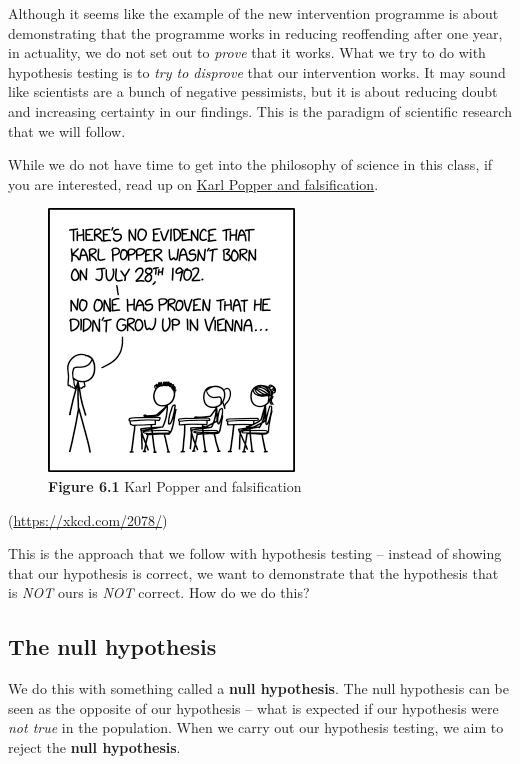 \documentclass[
]{book}
\begin{document}
Although it seems like the example of the new intervention programme is about demonstrating that the programme works in reducing reoffending after one year, in actuality, we do not set out to \emph{prove} that it works. What we try to do with hypothesis testing is to \emph{try to disprove} that our intervention works. It may sound like scientists are a bunch of negative pessimists, but it is about reducing doubt and increasing certainty in our findings. This is the paradigm of scientific research that we will follow.

While we do not have time to get into the philosophy of science in this class, if you are interested, read up on \href{https://plato.stanford.edu/entries/popper/}{Karl Popper and falsification}.

\begin{figure}
\centering
\includegraphics{Images/popper.png}
\caption{\textbf{Figure 6.1} Karl Popper and falsification}
\end{figure}

(\url{https://xkcd.com/2078/})

This is the approach that we follow with hypothesis testing -- instead of showing that our hypothesis is correct, we want to demonstrate that the hypothesis that is \emph{NOT} ours is \emph{NOT} correct. How do we do this?

\hypertarget{the-null-hypothesis}{%
\subsection{The null hypothesis}\label{the-null-hypothesis}}

We do this with something called a \textbf{null hypothesis}. The null hypothesis can be seen as the opposite of our hypothesis -- what is expected if our hypothesis were \emph{not true} in the population. When we carry out our hypothesis testing, we aim to reject the \textbf{null hypothesis}.
\end{document}
